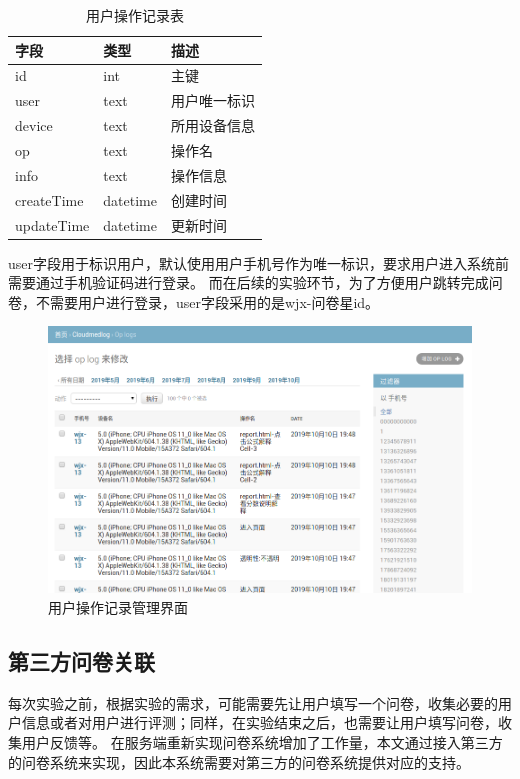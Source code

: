 \begin{table}[]
    \centering
    \caption{用户操作记录表}
    \begin{tabular}{lll}
        \toprule
        字段 & 类型 & 描述 \\ 
        \midrule
        id & int & 主键 \\
        user & text & 用户唯一标识 \\ 
        device & text & 所用设备信息 \\
        op & text & 操作名 \\
        info & text & 操作信息 \\
        createTime & datetime & 创建时间 \\
        updateTime & datetime & 更新时间\\
        \bottomrule
    \end{tabular}
    \label{tab:op_log}
\end{table}


user字段用于标识用户，默认使用用户手机号作为唯一标识，要求用户进入系统前需要通过手机验证码进行登录。
而在后续的实验环节，为了方便用户跳转完成问卷，不需要用户进行登录，user字段采用的是wjx-问卷星id。

\begin{figure}[ht]
    \centering
    \includegraphics[width=12cm]{images/op_log.png}
    \caption{用户操作记录管理界面}
    \label{fig:op_log}
\end{figure}

\subsection{第三方问卷关联}
每次实验之前，根据实验的需求，可能需要先让用户填写一个问卷，收集必要的用户信息或者对用户进行评测；同样，在实验结束之后，也需要让用户填写问卷，收集用户反馈等。
在服务端重新实现问卷系统增加了工作量，本文通过接入第三方的问卷系统来实现，因此本系统需要对第三方的问卷系统提供对应的支持。


